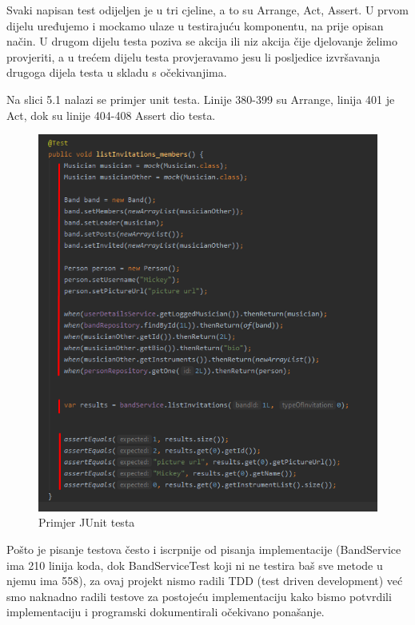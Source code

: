 			Svaki napisan test odijeljen je u tri cjeline, a to su Arrange, Act, Assert. U prvom dijelu uređujemo i mockamo ulaze u testirajuću komponentu, na prije opisan način. U drugom dijelu testa poziva se akcija ili niz akcija čije djelovanje želimo provjeriti, a u trećem dijelu testa provjeravamo jesu li posljedice izvršavanja drugoga dijela testa u skladu s očekivanjima.
			
			Na slici 5.1 nalazi se primjer unit testa. Linije 380-399 su Arrange, linija 401 je Act, dok su linije 404-408 Assert dio testa.
			
			\begin{figure}[H]
				\begin{center}
					\includegraphics[width=13cm]{slike/junit_test.PNG}
				\end{center}
				\caption{Primjer JUnit testa}
				\label{fig:junit}
			\end{figure}
		
			
			Pošto je pisanje testova često i iscrpnije od pisanja implementacije (BandService ima 210 linija koda, dok BandServiceTest koji ni ne testira baš sve metode u njemu ima 558), za ovaj projekt nismo radili TDD (test driven development) već smo naknadno radili testove za postojeću implementaciju kako bismo potvrdili implementaciju i programski dokumentirali očekivano ponašanje.
			
